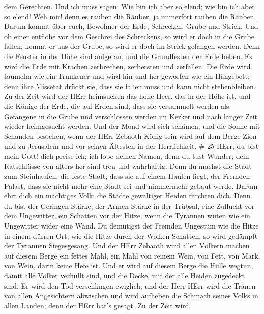 dem Gerechten. Und ich muss sagen: Wie bin ich aber so elend; wie bin
ich aber so elend! Weh mir! denn es rauben die Räuber, ja immerfort
rauben die Räuber.  Darum kommt über euch, Bewohner der
Erde, Schrecken, Grube und Strick.  Und ob einer entflöhe
vor dem Geschrei des Schreckens, so wird er doch in die Grube fallen;
kommt er aus der Grube, so wird er doch im Strick gefangen werden. Denn
die Fenster in der Höhe sind aufgetan, und die Grundfesten der Erde
beben.  Es wird die Erde mit Krachen zerbrechen, zerbersten
und zerfallen.  Die Erde wird taumelm wie ein Trunkener und
wird hin und her geworfen wie ein Hängebett; denn ihre Missetat drückt
sie, dass sie fallen muss und kann nicht stehenbleiben.  Zu
der Zeit wird der HErr heimsuchen das hohe Heer, das in der Höhe ist,
und die Könige der Erde, die auf Erden sind,  dass sie
versammelt werden als Gefangene in die Grube und verschlossen werden im
Kerker und nach langer Zeit wieder heimgesucht werden.  Und
der Mond wird sich schämen, und die Sonne mit Schanden bestehen, wenn
der HErr Zebaoth König sein wird auf dem Berge Zion und zu Jerusalem und
vor seinen Ältesten in der Herrlichkeit. \# 25  HErr, du
bist mein Gott! dich preise ich; ich lobe deinen Namen, denn du tust
Wunder; dein Ratschlüsse von alters her sind treu und wahrhaftig.
 Denn du machst die Stadt zum Steinhaufen, die feste Stadt,
dass sie auf einem Haufen liegt, der Fremden Palast, dass sie nicht mehr
eine Stadt sei und nimmermehr gebaut werde.  Darum ehrt dich
ein mächtiges Volk: die Städte gewaltiger Heiden fürchten dich.
 Denn du bist der Geringen Stärke, der Armen Stärke in der
Trübsal, eine Zuflucht vor dem Ungewitter, ein Schatten vor der Hitze,
wenn die Tyrannen wüten wie ein Ungewitter wider eine Wand. 
Du demütigst der Fremden Ungestüm wie die Hitze in einem dürren Ort; wie
die Hitze durch der Wolken Schatten, so wird gedämpft der Tyrannen
Siegesgesang.  Und der HErr Zebaoth wird allen Völkern
machen auf diesem Berge ein fettes Mahl, ein Mahl von reinem Wein, von
Fett, von Mark, von Wein, darin keine Hefe ist.  Und er wird
auf diesem Berge die Hülle wegtun, damit alle Völker verhüllt sind, und
die Decke, mit der alle Heiden zugedeckt sind.  Er wird den
Tod verschlingen ewiglich; und der Herr HErr wird die Tränen von allen
Angesichtern abwischen und wird aufheben die Schmach seines Volks in
allen Landen; denn der HErr hat's gesagt.  Zu der Zeit wird
